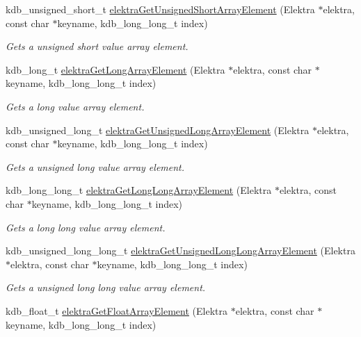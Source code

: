 \begin{DoxyCompactItemize}
kdb\+\_\+unsigned\+\_\+short\+\_\+t \hyperlink{group__highlevel_ga6a2f7bae625b970144b49ea42a2d5c00}{elektra\+Get\+Unsigned\+Short\+Array\+Element} (Elektra $\ast$elektra, const char $\ast$keyname, kdb\+\_\+long\+\_\+long\+\_\+t index)
\begin{DoxyCompactList}\small\item\em Gets a unsigned short value array element. \end{DoxyCompactList}\item 
kdb\+\_\+long\+\_\+t \hyperlink{group__highlevel_ga0ac109ad5a0cd4b3c92ee050bc5649b5}{elektra\+Get\+Long\+Array\+Element} (Elektra $\ast$elektra, const char $\ast$keyname, kdb\+\_\+long\+\_\+long\+\_\+t index)
\begin{DoxyCompactList}\small\item\em Gets a long value array element. \end{DoxyCompactList}\item 
kdb\+\_\+unsigned\+\_\+long\+\_\+t \hyperlink{group__highlevel_ga8eb3597a96134c11f5d04a4613c44b92}{elektra\+Get\+Unsigned\+Long\+Array\+Element} (Elektra $\ast$elektra, const char $\ast$keyname, kdb\+\_\+long\+\_\+long\+\_\+t index)
\begin{DoxyCompactList}\small\item\em Gets a unsigned long value array element. \end{DoxyCompactList}\item 
kdb\+\_\+long\+\_\+long\+\_\+t \hyperlink{group__highlevel_gaa55dfc31eaca932f963461eb1a1e1f86}{elektra\+Get\+Long\+Long\+Array\+Element} (Elektra $\ast$elektra, const char $\ast$keyname, kdb\+\_\+long\+\_\+long\+\_\+t index)
\begin{DoxyCompactList}\small\item\em Gets a long long value array element. \end{DoxyCompactList}\item 
kdb\+\_\+unsigned\+\_\+long\+\_\+long\+\_\+t \hyperlink{group__highlevel_ga7fbb3695614f81db6074375d7819479f}{elektra\+Get\+Unsigned\+Long\+Long\+Array\+Element} (Elektra $\ast$elektra, const char $\ast$keyname, kdb\+\_\+long\+\_\+long\+\_\+t index)
\begin{DoxyCompactList}\small\item\em Gets a unsigned long long value array element. \end{DoxyCompactList}\item 
kdb\+\_\+float\+\_\+t \hyperlink{group__highlevel_ga12730b6a7b6e6b0ff462e6dd0c4af69c}{elektra\+Get\+Float\+Array\+Element} (Elektra $\ast$elektra, const char $\ast$keyname, kdb\+\_\+long\+\_\+long\+\_\+t index)

\end{DoxyCompactItemize}
